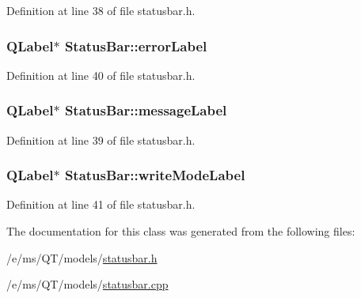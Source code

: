 Definition at line 38 of file statusbar.h.

\hypertarget{classStatusBar_a4b649a765f9858eb5432ae641ed8ae5e}{
\subsubsection[{errorLabel}]{\setlength{\rightskip}{0pt plus 5cm}QLabel$\ast$ {\bf StatusBar::errorLabel}}}
\label{classStatusBar_a4b649a765f9858eb5432ae641ed8ae5e}


Definition at line 40 of file statusbar.h.

\hypertarget{classStatusBar_a75bb9f05dd0058406ad412b0aa04d1e7}{
\subsubsection[{messageLabel}]{\setlength{\rightskip}{0pt plus 5cm}QLabel$\ast$ {\bf StatusBar::messageLabel}}}
\label{classStatusBar_a75bb9f05dd0058406ad412b0aa04d1e7}


Definition at line 39 of file statusbar.h.

\hypertarget{classStatusBar_ac733bf5674b8d1fcbef6e0ba33346a7c}{
\subsubsection[{writeModeLabel}]{\setlength{\rightskip}{0pt plus 5cm}QLabel$\ast$ {\bf StatusBar::writeModeLabel}}}
\label{classStatusBar_ac733bf5674b8d1fcbef6e0ba33346a7c}


Definition at line 41 of file statusbar.h.



The documentation for this class was generated from the following files:\begin{DoxyCompactItemize}
\item 
/e/ms/QT/models/\hyperlink{statusbar_8h}{statusbar.h}\item 
/e/ms/QT/models/\hyperlink{statusbar_8cpp}{statusbar.cpp}\end{DoxyCompactItemize}
